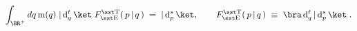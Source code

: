 \begin{equation}
\int_{\BR^+}dq\,{\rm m}(q)\;
|\,{\rm d}_{q}^t\,\ket\;F_{\rm\sst E}^{\rm\sst T}(\,p\,|\,q\,)\;
=\; |\,{\rm d}_{p}^s\,\ket,\qquad
F_{\rm\sst E}^{\rm\sst T}(\,p\,|\,q\,)\;\equiv\; 
\bra\,{\rm d}_q^t\,|\,{\rm d}_p^s\,\ket\; .
\end{equation}

